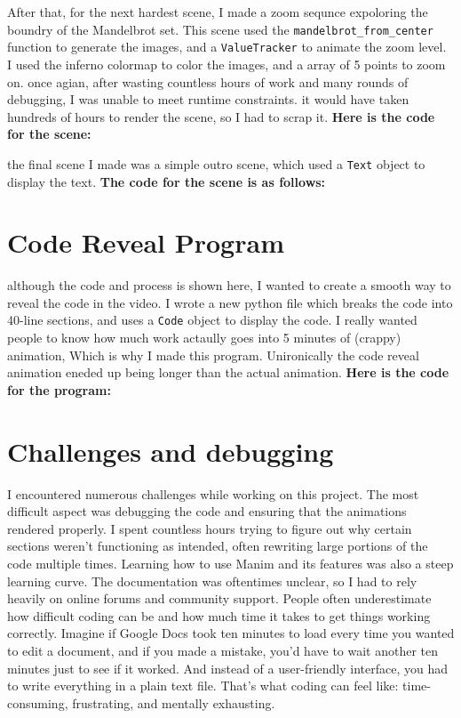 \documentclass{article}
\begin{document}
After that, for the next hardest scene, I made a zoom sequnce expoloring the boundry of the Mandelbrot set.
This scene used the \texttt{mandelbrot\_from\_center} function to generate the images, and a \texttt{ValueTracker} to animate the zoom level.
I used the inferno colormap to color the images, and a array of 5 points to zoom on. once agian, after wasting countless hours of work and many rounds of debugging,
I was unable to meet runtime constraints. it would have taken hundreds of hours to render the scene, so I had to scrap it.
\textbf{Here is the code for the scene:}



the final scene I made was a simple outro scene, which used a \texttt{Text} object to display the text.
\textbf{The code for the scene is as follows:}



\section{Code Reveal Program}

although the code and process is shown here, I wanted to create a smooth way to reveal the code in the video.
I wrote a new python file which breaks the code into 40-line sections, and uses a \texttt{Code} object to display the code.
I really wanted people to know how much work actaully goes into 5 minutes of (crappy) animation, Which is why I made 
this program. Unironically the code reveal animation eneded up being longer than the actual animation.
\textbf{Here is the code for the program:}



\section{Challenges and debugging}
I encountered numerous challenges while working on this project.
The most difficult aspect was debugging the code and ensuring that the animations rendered properly.
I spent countless hours trying to figure out why certain sections weren’t functioning as intended, often rewriting large portions of the code multiple times.
Learning how to use Manim and its features was also a steep learning curve.
The documentation was oftentimes unclear, so I had to rely heavily on online forums and community support.
People often underestimate how difficult coding can be and how much time it takes to get things working correctly.
Imagine if Google Docs took ten minutes to load every time you wanted to edit a document, and if you made a mistake, you’d have to wait another ten minutes just to see if it worked.
And instead of a user-friendly interface, you had to write everything in a plain text file.
That’s what coding can feel like: time-consuming, frustrating, and mentally exhausting.
\end{document}
